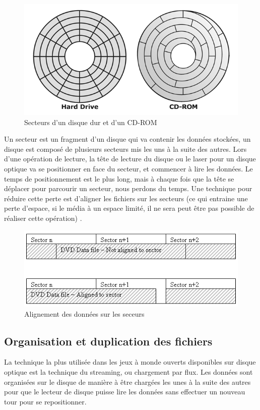 \documentclass[a4paper, 11pt]{article} %
\begin{document}
\begin{figure}[!h]%
\begin{center} 
\includegraphics[width=0.60\columnwidth]{images/disk_sector.png}%
\caption{Secteurs d'un disque dur et d'un CD-ROM}%
\label{}%
\end{center}
\end{figure}

Un secteur est un fragment d'un disque qui va contenir les données stockées, un disque est composé de plusieurs secteurs mis les uns à la suite des autres. Lors d'une opération de lecture, la tête de lecture du disque ou le laser pour un disque optique va se positionner en face du secteur, et commencer à lire les données. Le temps de positionnement est le plus long, mais à chaque fois que la tête se déplacer pour parcourir un secteur, nous perdons du temps. 
Une technique pour réduire cette perte est d'aligner les fichiers sur les secteurs (ce qui entraine une perte d'espace, si le média à un espace limité, il ne sera peut être pas possible de réaliser cette opération) \cite{industry:streaming-for-loading}.

\begin{figure}[!h]%
\begin{center} 
\includegraphics[width=0.60\columnwidth]{images/sector_storage.png}%
\caption{Alignement des données sur les seceurs}%
\label{}%
\end{center}
\end{figure}

\newpage
\subsection*{Organisation et duplication des fichiers}
La technique la plus utilisée dans les jeux à monde ouverts disponibles sur disque optique est la technique du streaming, ou chargement par flux. Les données sont organisées sur le disque de manière à être chargées les unes à la suite des autres pour que le lecteur de disque puisse lire les données sans effectuer un nouveau tour pour se repositionner.
\end{document}
